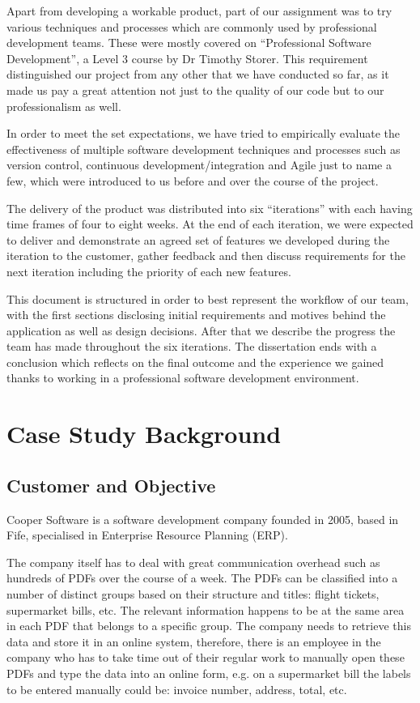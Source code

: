 \documentclass{l3proj}
\begin{document}
Apart from developing a workable product, part of our assignment was to try various techniques and processes which are commonly used by professional development teams. These were mostly covered on ``Professional Software Development'', a Level 3 course by Dr Timothy Storer. This requirement distinguished our project from any other that we have conducted so far, as it made us pay a great attention not just to the quality of our code but to our professionalism as well.

In order to meet the set expectations, we have tried to empirically evaluate the effectiveness of multiple software development techniques and processes such as version control, continuous development/integration and Agile just to name a few, which were introduced to us before and over the course of the project. 

The delivery of the product was distributed into six ``iterations'' with each having time frames of four to eight weeks. At the end of each iteration, we were expected to deliver and demonstrate an agreed set of features we developed during the iteration to the customer, gather feedback and then discuss requirements for the next iteration including the priority of each new features.

This document is structured in order to best represent the workflow of our team, with the first sections disclosing initial requirements and motives behind the application as well as design decisions. After that we describe the progress the team has made throughout the six iterations. The dissertation ends with a conclusion which reflects on the final outcome and the experience we gained thanks to working in a professional software development environment.
\section{Case Study Background}
\subsection{Customer and Objective}

Cooper Software is a software development company founded in 2005, based in Fife, specialised in Enterprise Resource Planning (ERP).

The company itself has to deal with great communication overhead such as hundreds of PDFs over the course of a week. The PDFs can be classified into a number of distinct groups based on their structure and titles: flight tickets, supermarket bills, etc. The relevant information happens to be at the same area in each PDF that belongs to a specific group. The company needs to retrieve this data and store it in an online system, therefore, there is an employee in the company who has to take time out of their regular work to manually open these PDFs and type the data into an online form, e.g. on a supermarket bill the labels to be entered manually could be: invoice number, address, total, etc.
\end{document}
